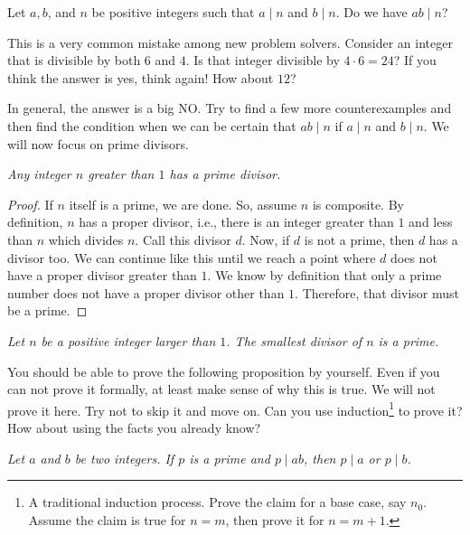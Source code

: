 \documentclass{subfile}
\begin{document}
	\begin{question}
		Let $a,b$, and $n$ be positive integers such that $a\mid n$ and $b\mid n$. Do we have $ab \mid n$?
	\end{question}
	This is a very common mistake among new problem solvers. Consider an integer that is divisible by both $6$ and $4$. Is that integer divisible by $4\cdot6=24$? If you think the answer is yes, think again! How about $12$?

	In general, the answer is a big NO. Try to find a few more counterexamples and then find the condition when we can be certain that $ab \mid n$ if $a\mid n$ and $b\mid n$. We will now focus on prime divisors.

	\begin{proposition}\slshape
		Any integer $n$ greater than $1$ has a prime divisor.
	\end{proposition}

	\begin{proof}
		If $n$ itself is a prime, we are done. So, assume $n$ is composite. By definition, $n$ has a proper divisor, i.e., there is an integer greater than $1$ and less than $n$ which divides $n$. Call this divisor $d$. Now, if $d$ is not a prime, then $d$ has a divisor too. We can continue like this until we reach a point where $d$ does not have a proper divisor greater than $1$. We know by definition that only a prime number does not have a proper divisor other than $1$. Therefore, that divisor must be a prime.
	\end{proof}

	\begin{corollary}\slshape\label{cor:smallestdivisor}
		Let $n$ be a positive integer larger than $1$. The smallest divisor of $n$ is a prime.
	\end{corollary}

	You should be able to prove the following proposition by yourself. Even if you can not prove it formally, at least make sense of why this is true. We will not prove it here. Try not to skip it and move on. Can you use induction\footnote{A traditional induction process. Prove the claim for a base case, say $n_0$. Assume the claim is true for $n=m$, then prove it for $n=m+1$.} to prove it? How about using the facts you already know?

	\begin{proposition}\slshape\label{prop:euclidslemma}
		Let $a$ and $b$ be two integers. If $p$ is a prime and $p\mid ab$, then $p\mid a$ or $p\mid b$.
	\end{proposition}
\end{document}
